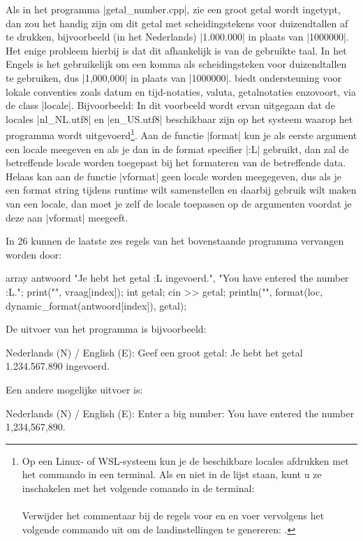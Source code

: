 \begin{cpplstShortInline}
Als in het programma |getal_number.cpp|, zie  een groot getal wordt ingetypt, dan zou het handig zijn om dit getal met scheidingstekens voor duizendtallen af te drukken, bijvoorbeeld (in het Nederlands) |1.000.000| in plaats van |1000000|.
Het enige probleem hierbij is dat dit afhankelijk is van de gebruikte taal.
In het Engels is het gebruikelijk om een komma als scheidingsteken voor duizendtallen te gebruiken, dus |1,000,000| in plaats van |1000000|.
\Cpp{} biedt ondersteuning voor lokale conventies zoals datum en tijd-notaties, valuta, getalnotaties enzovoort, via de class |locale|.
Bijvoorbeeld:
In dit voorbeeld wordt ervan uitgegaan dat de locales |nl_NL.utf8| en |en_US.utf8| beschikbaar zijn op het systeem waarop het programma wordt uitgevoerd\footnote{%
	Op een Linux- of WSL-systeem kun je de beschikbare locales afdrukken met het commando  in een terminal.
	Als  en  niet in de lijst staan, kunt u ze inschakelen met het volgende comando in de terminal:\\
	\\
	Verwijder het commentaar bij de regels voor  en  en voer vervolgens het volgende commando uit om de landinstellingen te genereren: .
}.
Aan de functie |format| kun je als eerste argument een locale meegeven en als je dan in de format specifier |{:L}| gebruikt, dan zal de betreffende locale worden toegepast bij het formateren van de betreffende data.
Helaas kan aan de functie |vformat| geen locale worden meegegeven, dus als je een format string tijdens runtime wilt samenstellen en daarbij gebruik wilt maken van een locale, dan moet je zelf de locale toepassen op de argumenten voordat je deze aan |vformat| meegeeft.

In \Cpp{}26 kunnen de laatste zes regels van het bovenstaande programma vervangen worden door:
\begin{cpplstfragment}
    array antwoord {"Je hebt het getal {:L} ingevoerd.", "You have entered the number {:L}."};
    print("{}", vraag[index]);
    int getal;
    cin >> getal;
    println("{}", format(loc, dynamic_format(antwoord[index]), getal);
\end{cpplstfragment}

De uitvoer van het programma  is bijvoorbeeld:
\begin{coutput}
Nederlands (N) / English (E): 
Geef een groot getal: 
Je hebt het getal 1.234.567.890 ingevoerd.
\end{coutput}

Een andere mogelijke uitvoer is:
\begin{coutput}
Nederlands (N) / English (E): 
Enter a big number: 
You have entered the number 1,234,567,890.
\end{coutput}

\end{cpplstShortInline}

\printbibliography[heading=bibintoc]{}

\backmatter
\appendix

